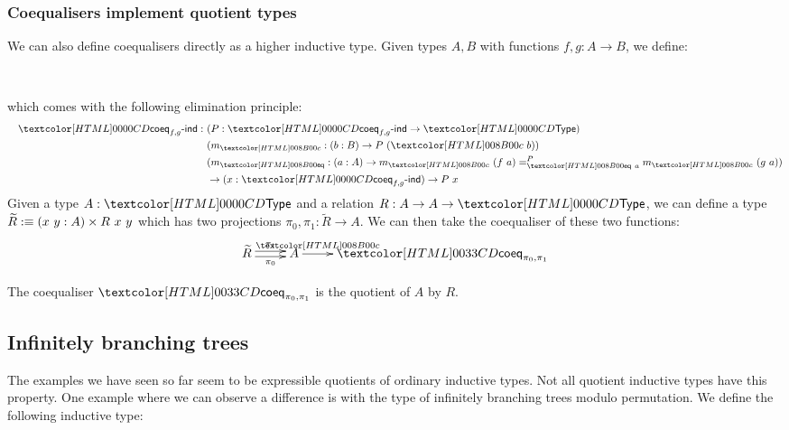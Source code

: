 \subsubsection{Coequalisers implement quotient types}

We can also define coequalisers directly as a higher inductive
type. Given types $A, B$ with functions $f, g : A \to B$, we define:
%
\begin{datatype}{}{\Type}
   \\
\end{datatype}
%
which comes with the following elimination principle:
%
\begin{align*}
  &&\coeqind{f}{g} : &\ (P : \coeqind{f}{g} \to \Type) \\
  &&&\ (m_{\coeqproj} : (b : B) \to P\ (\coeqproj\ b)) \\
  &&&\ (m_{\coeqeq} : (a : A) \to \pathover{P}{\coeqeq\ a}{m_{\coeqproj}\ (f\ a)}{m_{\coeqproj}\ (g\ a)}) \\
  &&&\ \to (x : \coeqind{f}{g}) \to P\ x
\end{align*}
%
Given a type $A : \Type$ and a relation $R : A \to A \to \Type$, we
can define a type $\widetilde{R} \ddefeq (x\ y : A) \times R\ x \ y$ which
has two projections $\pi_0, \pi_1 : \widetilde{R} \to A$. We can then take
the coequaliser of these two functions:
$$
\xymatrix{
\widetilde{R} \ar@<-.5ex>[r]_{\pi_0} \ar@<.5ex>[r]^{\pi_1} &A \ar[r]^-{\coeqproj} &\coeqty{\pi_0}{\pi_1}
}
$$

\begin{proposition}
  The coequaliser $\coeqty{\pi_0}{\pi_1}$ is the quotient of $A$ by
  $R$.
\end{proposition}

\subsection{Infinitely branching trees}

The examples we have seen so far seem to be expressible quotients of
ordinary inductive types. Not all quotient inductive types have this
property. One example where we can observe a difference is with the
type of infinitely branching trees modulo permutation. We define the
following inductive type:
%
\begin{datatype}{\treety}{\Set}
  \constr{\treeleaf}{\treety} \\
  \constr{\treenode}{(\natty \to \treety) \to \treety} \\
\end{datatype}

